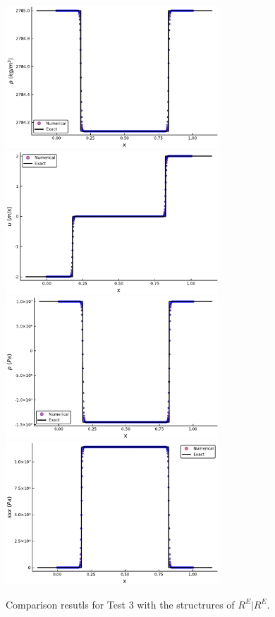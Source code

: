 \documentclass{article}
\numberwithin{equation}{section}
\numberwithin{table}{section}
\begin{document}
\begin{figure}
  \centering

  \includegraphics[width= 8cm] {case4rho.pdf}
  \includegraphics[width= 8cm] {case4u.pdf}
  \includegraphics[width= 8cm] {case4p.pdf}
  \includegraphics[width= 8cm] {case4sxx.pdf}

    \caption{Comparison resutls for Test 3 with the structrures of $R^E|R^E$.  }
  \label{fig:case3}
\end{figure}
\end{document}
